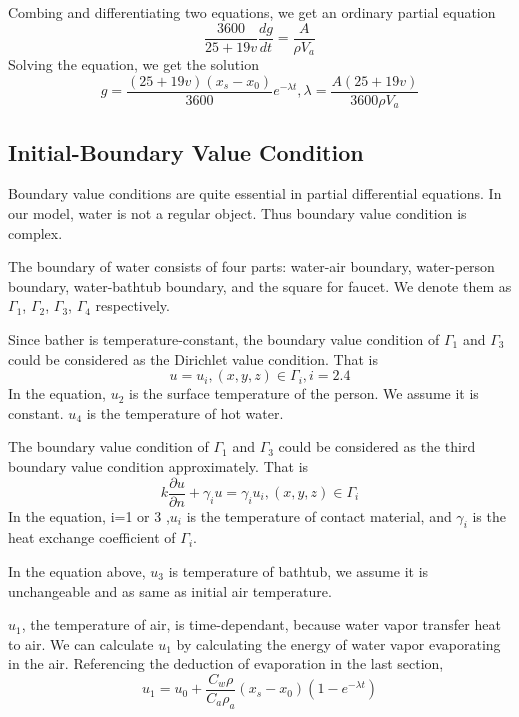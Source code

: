 \documentclass[12pt,a4paper,titlepage]{article}
\begin{document}
Combing and differentiating two equations, we get an ordinary partial equation
\begin{equation}
 \frac{3600}{25+19v} \frac{dg}{dt}=\frac{A}{\rho {V_a}}
\end{equation}
Solving the equation, we get the solution
\begin{equation}
 g=\frac{(25+19v)({x_s}-{x_0})}{3600}e^{-\lambda t}, \lambda =\frac{A(25+19v)}{3600\rho {V_a}}
\end{equation}


\subsection{Initial-Boundary Value Condition}
\label{initial-boundary value condition}

Boundary value conditions are quite essential in partial differential equations. In our model, water is not a regular object. Thus boundary value condition is complex.

The boundary of water consists of four parts: water-air boundary, water-person boundary, water-bathtub boundary, and the square for faucet. We denote them as
${\Gamma}_1$, ${\Gamma}_2$, ${\Gamma}_3$, ${\Gamma}_4$ respectively.

Since bather is temperature-constant, the boundary value condition of ${\Gamma}_1$ and ${\Gamma}_3$ could be considered
as the Dirichlet value condition. That is
\begin{equation}
 u=u_i, (x,y,z)\in {\Gamma}_i, i=2.4
\end{equation}
In the equation, $u_2$ is the surface temperature of the person. We assume it is constant. $u_4$ is the temperature of hot water.

The boundary value condition of ${\Gamma}_1$ and ${\Gamma}_3$ could be considered as the third boundary value condition approximately. That is
\begin{equation}
 k\frac{\partial u}{\partial n}+{{\gamma}_i}u={{\gamma}_i}{u_i}, (x,y,z)\in {\Gamma}_i
\end{equation}
In the equation, i=1 or 3 ,$u_i$ is the temperature of contact material, and
${\gamma}_i$ is the heat exchange coefficient of ${\Gamma}_i$.

In the equation above, $u_3$ is temperature of bathtub, we assume it is unchangeable and as same as initial air temperature.

$u_1$, the temperature of air, is time-dependant, because water vapor transfer heat to air. We can calculate $u_1$ by calculating the energy of water vapor evaporating in the air. Referencing the deduction of evaporation in the last section,
\begin{equation}
  u_1=u_0+\frac{C_w\rho}{C_a{{\rho}_a}} (x_s-x_0)(1-e^{-\lambda t})
\end{equation}
\end{document}
